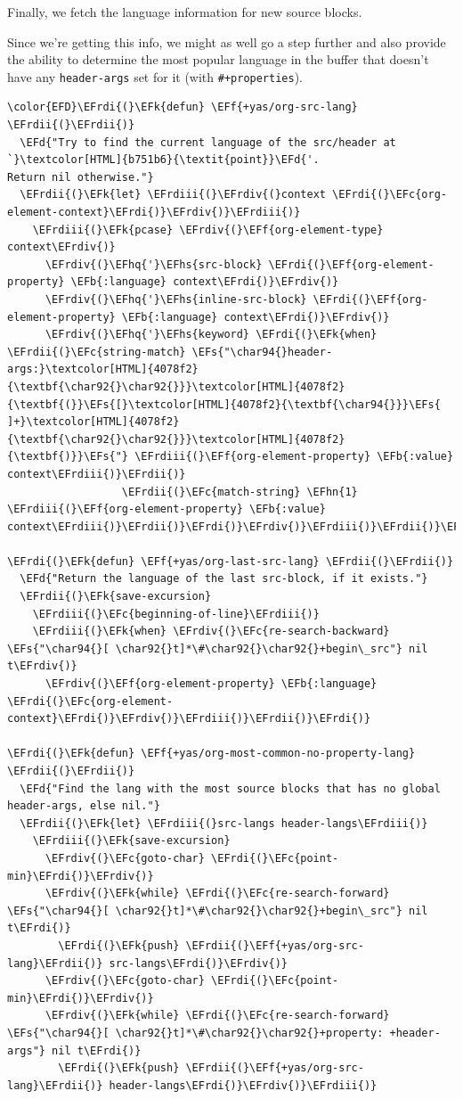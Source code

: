 \documentclass{scrartcl}
\newcommand{\EFk}[1]{\textcolor{EFk}{#1}} %
\newcommand{\EFd}[1]{\textcolor{EFd}{\textit{#1}}} %
\newcommand{\EFs}[1]{\textcolor{EFs}{#1}} %
\newcommand{\EFb}[1]{\textcolor{EFb}{#1}} %
\newcommand{\EFc}[1]{\textcolor{EFc}{#1}} %
\newcommand{\EFf}[1]{\textcolor{EFf}{#1}} %
\newcommand{\EFhn}[1]{\textcolor{EFhn}{\textbf{#1}}} %
\newcommand{\EFhq}[1]{\textcolor{EFhq}{#1}} %
\newcommand{\EFhs}[1]{\textcolor{EFhs}{#1}} %
\newcommand{\EFrdi}[1]{\textcolor{EFrdi}{#1}} %
\newcommand{\EFrdii}[1]{\textcolor{EFrdii}{#1}} %
\newcommand{\EFrdiii}[1]{\textcolor{EFrdiii}{#1}} %
\newcommand{\EFrdiv}[1]{\textcolor{EFrdiv}{#1}} %
\begin{document}
Finally, we fetch the language information for new source blocks.

Since we're getting this info, we might as well go a step further and also
provide the ability to determine the most popular language in the buffer that
doesn't have any \texttt{header-args} set for it (with \texttt{\#+properties}).

\begin{Code}
\begin{Verbatim}[]
\color{EFD}\EFrdi{(}\EFk{defun} \EFf{+yas/org-src-lang} \EFrdii{(}\EFrdii{)}
  \EFd{"Try to find the current language of the src/header at `}\textcolor[HTML]{b751b6}{\textit{point}}\EFd{'.
Return nil otherwise."}
  \EFrdii{(}\EFk{let} \EFrdiii{(}\EFrdiv{(}context \EFrdi{(}\EFc{org-element-context}\EFrdi{)}\EFrdiv{)}\EFrdiii{)}
    \EFrdiii{(}\EFk{pcase} \EFrdiv{(}\EFf{org-element-type} context\EFrdiv{)}
      \EFrdiv{(}\EFhq{'}\EFhs{src-block} \EFrdi{(}\EFf{org-element-property} \EFb{:language} context\EFrdi{)}\EFrdiv{)}
      \EFrdiv{(}\EFhq{'}\EFhs{inline-src-block} \EFrdi{(}\EFf{org-element-property} \EFb{:language} context\EFrdi{)}\EFrdiv{)}
      \EFrdiv{(}\EFhq{'}\EFhs{keyword} \EFrdi{(}\EFk{when} \EFrdii{(}\EFc{string-match} \EFs{"\char94{}header-args:}\textcolor[HTML]{4078f2}{\textbf{\char92{}\char92{}}}\textcolor[HTML]{4078f2}{\textbf{(}}\EFs{[}\textcolor[HTML]{4078f2}{\textbf{\char94{}}}\EFs{ ]+}\textcolor[HTML]{4078f2}{\textbf{\char92{}\char92{}}}\textcolor[HTML]{4078f2}{\textbf{)}}\EFs{"} \EFrdiii{(}\EFf{org-element-property} \EFb{:value} context\EFrdiii{)}\EFrdii{)}
                  \EFrdii{(}\EFc{match-string} \EFhn{1} \EFrdiii{(}\EFf{org-element-property} \EFb{:value} context\EFrdiii{)}\EFrdii{)}\EFrdi{)}\EFrdiv{)}\EFrdiii{)}\EFrdii{)}\EFrdi{)}

\EFrdi{(}\EFk{defun} \EFf{+yas/org-last-src-lang} \EFrdii{(}\EFrdii{)}
  \EFd{"Return the language of the last src-block, if it exists."}
  \EFrdii{(}\EFk{save-excursion}
    \EFrdiii{(}\EFc{beginning-of-line}\EFrdiii{)}
    \EFrdiii{(}\EFk{when} \EFrdiv{(}\EFc{re-search-backward} \EFs{"\char94{}[ \char92{}t]*\#\char92{}\char92{}+begin\_src"} nil t\EFrdiv{)}
      \EFrdiv{(}\EFf{org-element-property} \EFb{:language} \EFrdi{(}\EFc{org-element-context}\EFrdi{)}\EFrdiv{)}\EFrdiii{)}\EFrdii{)}\EFrdi{)}

\EFrdi{(}\EFk{defun} \EFf{+yas/org-most-common-no-property-lang} \EFrdii{(}\EFrdii{)}
  \EFd{"Find the lang with the most source blocks that has no global header-args, else nil."}
  \EFrdii{(}\EFk{let} \EFrdiii{(}src-langs header-langs\EFrdiii{)}
    \EFrdiii{(}\EFk{save-excursion}
      \EFrdiv{(}\EFc{goto-char} \EFrdi{(}\EFc{point-min}\EFrdi{)}\EFrdiv{)}
      \EFrdiv{(}\EFk{while} \EFrdi{(}\EFc{re-search-forward} \EFs{"\char94{}[ \char92{}t]*\#\char92{}\char92{}+begin\_src"} nil t\EFrdi{)}
        \EFrdi{(}\EFk{push} \EFrdii{(}\EFf{+yas/org-src-lang}\EFrdii{)} src-langs\EFrdi{)}\EFrdiv{)}
      \EFrdiv{(}\EFc{goto-char} \EFrdi{(}\EFc{point-min}\EFrdi{)}\EFrdiv{)}
      \EFrdiv{(}\EFk{while} \EFrdi{(}\EFc{re-search-forward} \EFs{"\char94{}[ \char92{}t]*\#\char92{}\char92{}+property: +header-args"} nil t\EFrdi{)}
        \EFrdi{(}\EFk{push} \EFrdii{(}\EFf{+yas/org-src-lang}\EFrdii{)} header-langs\EFrdi{)}\EFrdiv{)}\EFrdiii{)}


\end{Verbatim}
\end{Code}
\end{document}
